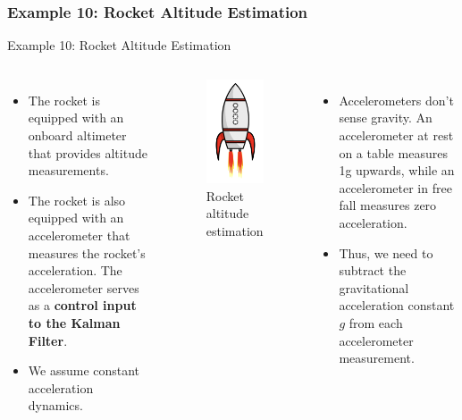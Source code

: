 \subsubsection{Example 10: Rocket Altitude Estimation}
\begin{frame}{Example 10: Rocket Altitude Estimation}
\begin{columns}
\begin{itemize}
    \item The rocket is equipped with an
onboard altimeter that provides altitude measurements.
    \item The rocket is also equipped with an accelerometer that measures the rocket’s acceleration. The accelerometer serves as a \textbf{control input to the Kalman Filter}.
    \item We assume constant acceleration dynamics.
\end{itemize}

\begin{figure}
    \centering
    \includegraphics[width=0.35\linewidth]{Figures//Chapter3/Ex10_Rocket.png}
    \vspace{-10pt}
    \caption{Rocket altitude estimation}
    \label{fig:Rocket}
\end{figure}

\begin{itemize}
    \item Accelerometers don’t sense gravity. An accelerometer at rest on a table measures 1g
upwards, while an accelerometer in free fall measures zero acceleration.
    \item Thus, we
need to subtract the gravitational acceleration constant $g$ from each accelerometer measurement.
\end{itemize}
 

\end{columns}
\end{frame}

